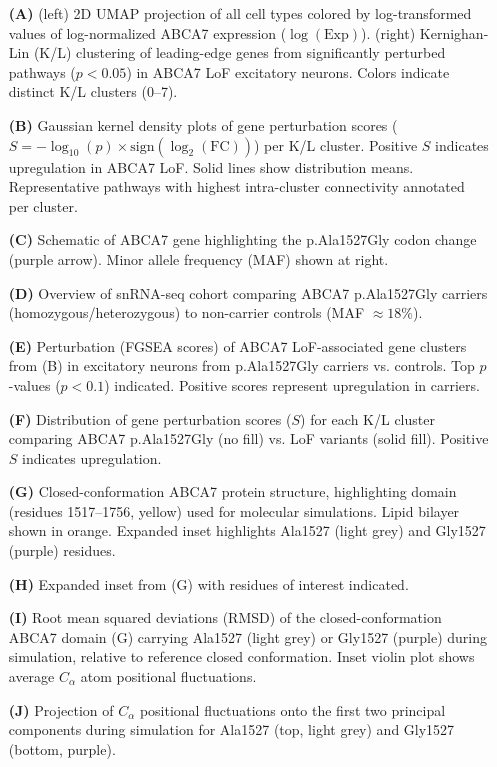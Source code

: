 \begin{itemize}
    \item[\textbf{(A)}] (left) 2D UMAP projection of all cell types colored by log-transformed values of log-normalized ABCA7 expression ($\log(\text{Exp})$). (right) Kernighan-Lin (K/L) clustering of leading-edge genes from significantly perturbed pathways ($p<0.05$) in ABCA7 LoF excitatory neurons. Colors indicate distinct K/L clusters (0–7).
    \item[\textbf{(B)}] Gaussian kernel density plots of gene perturbation scores ($S=-\log_{10}(p)\times\text{sign}(\log_2(\text{FC}))$) per K/L cluster. Positive $S$ indicates upregulation in ABCA7 LoF. Solid lines show distribution means. Representative pathways with highest intra-cluster connectivity annotated per cluster.
    \item[\textbf{(C)}] Schematic of ABCA7 gene highlighting the p.Ala1527Gly codon change (purple arrow). Minor allele frequency (MAF) shown at right.
    \item[\textbf{(D)}] Overview of snRNA-seq cohort comparing ABCA7 p.Ala1527Gly carriers (homozygous/heterozygous) to non-carrier controls (MAF $\approx18\%$).
    \item[\textbf{(E)}] Perturbation (FGSEA scores) of ABCA7 LoF-associated gene clusters from (B) in excitatory neurons from p.Ala1527Gly carriers vs. controls. Top $p$-values ($p<0.1$) indicated. Positive scores represent upregulation in carriers.
    \item[\textbf{(F)}] Distribution of gene perturbation scores ($S$) for each K/L cluster comparing ABCA7 p.Ala1527Gly (no fill) vs. LoF variants (solid fill). Positive $S$ indicates upregulation.
    \item[\textbf{(G)}] Closed-conformation ABCA7 protein structure, highlighting domain (residues 1517–1756, yellow) used for molecular simulations. Lipid bilayer shown in orange. Expanded inset highlights Ala1527 (light grey) and Gly1527 (purple) residues.
    \item[\textbf{(H)}] Expanded inset from (G) with residues of interest indicated.
    \item[\textbf{(I)}] Root mean squared deviations (RMSD) of the closed-conformation ABCA7 domain (G) carrying Ala1527 (light grey) or Gly1527 (purple) during simulation, relative to reference closed conformation. Inset violin plot shows average $C_\alpha$ atom positional fluctuations.
    \item[\textbf{(J)}] Projection of $C_\alpha$ positional fluctuations onto the first two principal components during simulation for Ala1527 (top, light grey) and Gly1527 (bottom, purple).
\end{itemize}